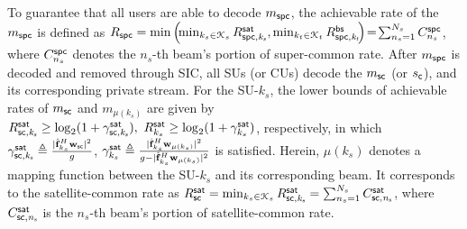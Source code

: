 \documentclass[draftclsnofoot, onecolumn, comsoc, 12pt]{IEEEtran}
\begin{document}
To guarantee that all users are able to decode $m_{\sf spc}$, the achievable rate of the $m_{\sf spc}$ is defined as
    $R_{\sf{spc}} = \min \left( \!\min_{k_{s}\in \mathcal{K}_{s}}R_{\sf{spc},\it{k_{s}}}^{\sf{sat}}, \min_{k_{t}\in \mathcal{K}_{t}}R_{\sf{spc},\it{k_{t}}}^{\sf{bs}} \!\right)\! = \!\sum_{n_s=1}^{N_s}C^{\sf{spc}}_{n_s}$,
where $C^{\sf{spc}}_{n_s}$ denotes the $n_{s}$-th beam's portion of super-common rate.
After $m_{\sf{spc}}$ is decoded and removed through SIC, all SUs (or CUs) decode the $m_{\sf{sc}}$ (or $s_{\sf{c}}$), and its corresponding private stream. 
{For the SU-$k_{s}$, the lower bounds of achievable rates of $m_{\sf sc}$ and $m_{\mu(k_{s})}$ are given by} 
    $R_{\sf{sc}, \it{k_{s}}}^{\sf{sat}} 
\geq \mathrm{log}_{2}(1+\gamma_{\sf{sc}, \it{k_{s}}}^{\sf{sat}}), \ 
R_{k_{s}}^{\sf{sat}} 
\geq \mathrm{log}_{2}(1+\gamma_{k_{s}}^{\sf{sat}})$,
{respectively, in which $\gamma_{{\sf sc}, \it{k_{s}}}^{\sf{sat}} \triangleq \frac{|\hat{\mathbf{f}}_{k_{s}}^{H} \mathbf{w}_{\sf{sc}}|^{2}}{g}$, $\gamma_{k_{s}}^{\sf{sat}} \triangleq  \frac{|\hat{\mathbf{f}}_{k_{s}}^{H} \mathbf{w}_{\mu(k_{s})}|^{2}}
{g - |\hat{\mathbf{f}}_{k_{s}}^{H} \mathbf{w}_{\mu(k_{s})}|^{2}}$ is satisfied. Herein, $\mu(k_{s})$ denotes a mapping function between the SU-$k_{s}$ and its corresponding beam.} 
It corresponds to the satellite-common rate as $R_{\sf{sc}}^{\sf{sat}} = \min_{k_{s}\in \mathcal{K}_{s}}R_{\sf{sc},\it{k_{s}}}^{\sf{sat}}
= \sum_{n_s=1}^{N_s}C_{\sf{sc},\it{n_s}}^{\sf{sat}}$, where $C_{\sf{sc},\it{n_s}}^{\sf{sat}}$ is the $n_{s}$-th beam's portion of satellite-common rate.
\end{document}
